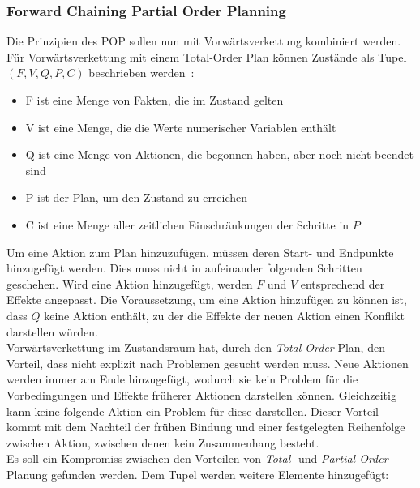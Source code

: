 \subsubsection{Forward Chaining Partial Order Planning}
Die Prinzipien des \ac{POP} sollen nun mit Vorwärtsverkettung kombiniert werden.
Für Vorwärtsverkettung mit einem Total-Order Plan können Zustände als Tupel $(F,V,Q,P,C)$ beschrieben werden~\citep{popf}:
\begin{itemize}
    \item F ist eine Menge von Fakten, die im Zustand gelten
    \item V ist eine Menge, die die Werte numerischer Variablen enthält
    \item Q ist eine Menge von Aktionen, die begonnen haben, aber noch nicht beendet sind
    \item P ist der Plan, um den Zustand zu erreichen
    \item C ist eine Menge aller zeitlichen Einschränkungen der Schritte in $P$
\end{itemize}
Um eine Aktion zum Plan hinzuzufügen, müssen deren Start- und Endpunkte hinzugefügt werden.
Dies muss nicht in aufeinander folgenden Schritten geschehen.
Wird eine Aktion hinzugefügt, werden $F$ und $V$ entsprechend der Effekte angepasst.
Die Voraussetzung, um eine Aktion hinzufügen zu können ist, dass $Q$ keine Aktion enthält, zu der die Effekte der neuen Aktion einen Konflikt darstellen würden.\\
Vorwärtsverkettung im Zustandsraum hat, durch den \emph{Total-Order}-Plan, den Vorteil, dass nicht explizit nach Problemen gesucht werden muss.
Neue Aktionen werden immer am Ende hinzugefügt, wodurch sie kein Problem für die Vorbedingungen und Effekte früherer Aktionen darstellen können.
Gleichzeitig kann keine folgende Aktion ein Problem für diese darstellen.
Dieser Vorteil kommt mit dem Nachteil der frühen Bindung und einer festgelegten Reihenfolge zwischen Aktion, zwischen denen kein Zusammenhang besteht.\\
Es soll ein Kompromiss zwischen den Vorteilen von \emph{Total-} und \emph{Partial-Order}-Planung gefunden werden.
Dem Tupel werden weitere Elemente hinzugefügt:
